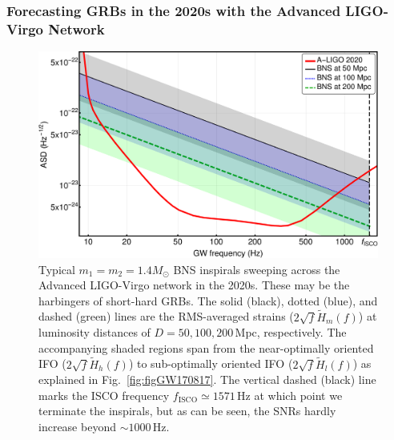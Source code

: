 \documentclass[prd,amsmath,amssymb,aps,floats,amsfonts,notitlepage,superscriptaddress,eqsecnum,nofootinbib,10pt]{revtex4-1}
\begin{document}
\subsubsection{Forecasting GRBs in the 2020s with the Advanced LIGO-Virgo Network}\label{Sec:ALIGO2020}
%
%
\begin{figure}[ht!]
\includegraphics[width=\linewidth]{../Figures/ALigo_strains.pdf}
\caption{Typical $m_1=m_2=1.4 M_\odot$ BNS inspirals sweeping across the Advanced LIGO-Virgo network in the 2020s.
These may be the harbingers of short-hard GRBs.
The solid (black), dotted (blue), and dashed (green) lines are the RMS-averaged strains ($2\sqrt{f}\tilde{H}_m(f)$) at luminosity distances of $D=50, 100, 200\,$Mpc, respectively. The accompanying shaded regions span from the near-optimally oriented IFO 
($2\sqrt{f}\tilde{H}_h(f)$) to
sub-optimally oriented IFO ($2\sqrt{f}\tilde{H}_l(f)$) as explained in Fig.~\ref{fig:figGW170817}.
The vertical dashed (black) line marks the ISCO frequency $f_\text{ISCO} \simeq 1571\,$Hz at which point we terminate the inspirals,
but as can be seen, the SNRs hardly increase beyond $\sim 1000\,$Hz.
}
\label{fig:LIGO2020}
\end{figure}
%
%
\end{document}
